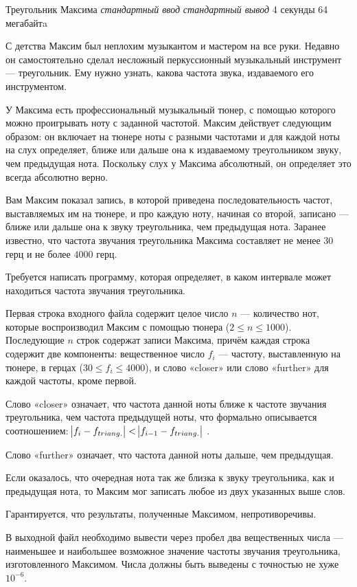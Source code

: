 \begin{problem}%
{Треугольник Максима}%
{\textsl{стандартный ввод}}%
{\textsl{стандартный вывод}}%
{4 секунды}%
{64 мегабайтa}{}

С детства Максим был неплохим музыкантом и мастером на все руки. Недавно он самостоятельно сделал несложный перкуссионный музыкальный инструмент — треугольник. Ему нужно узнать, какова частота звука, издаваемого его инструментом.

У Максима есть профессиональный музыкальный тюнер, с помощью которого можно проигрывать ноту с заданной частотой. Максим действует следующим образом: он включает на тюнере ноты с разными частотами и для каждой ноты на слух определяет, ближе или дальше она к издаваемому треугольником звуку, чем предыдущая нота. Поскольку слух у Максима абсолютный, он определяет это всегда абсолютно верно.

Вам Максим показал запись, в которой приведена последовательность частот, выставляемых им на тюнере, и про каждую ноту, начиная со второй, записано — ближе или дальше она к звуку треугольника, чем предыдущая нота. Заранее известно, что частота звучания треугольника Максима составляет не менее $30$ герц и не более $4000$ герц.

Требуется написать программу, которая определяет, в каком интервале может находиться частота звучания треугольника.

\InputFile

Первая строка входного файла содержит целое число $n$ — количество нот, которые воспроизводил Максим с помощью тюнера ($2 \le n \le 1000$). Последующие $n$ строк содержат записи Максима, причём каждая строка содержит две компоненты: вещественное число $f_i$ — частоту, выставленную на тюнере, в герцах ($30 \le f_i \le 4000$), и слово «closer» или слово «further» для каждой частоты, кроме первой.

Слово «closer» означает, что частота данной ноты ближе к частоте звучания треугольника, чем частота предыдущей ноты, что формально описывается соотношением: $\abs{f_i - f_{triang.}} < \abs{f_{i - 1} - f_{triang.}}$ .

Слово «further» означает, что частота данной ноты дальше, чем предыдущая.

Если оказалось, что очередная нота так же близка к звуку треугольника, как и предыдущая нота, то Максим мог записать любое из двух указанных выше слов.

Гарантируется, что результаты, полученные Максимом, непротиворечивы.
\OutputFile

В выходной файл необходимо вывести через пробел два вещественных числа — наименьшее и наибольшее возможное значение частоты звучания треугольника, изготовленного Максимом. Числа должны быть выведены с точностью не хуже $10^{-6}$.

\Examples

\begin{example}
%
%
\end{example}
\end{problem}

